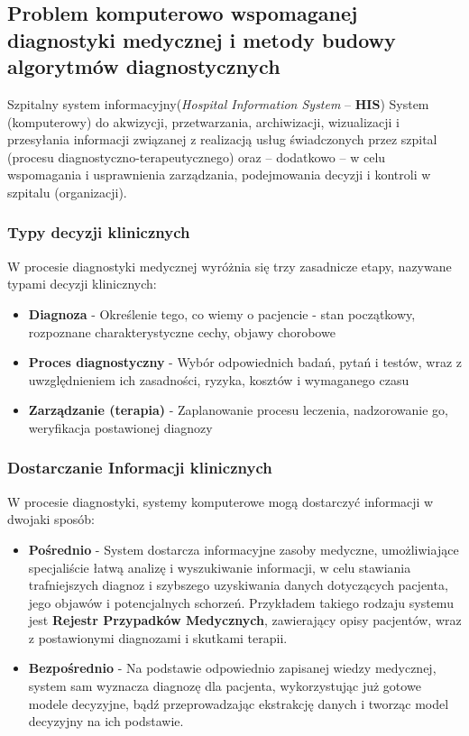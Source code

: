 \subsection{Problem komputerowo wspomaganej diagnostyki medycznej i metody budowy algorytmów diagnostycznych}

Szpitalny system informacyjny(\textit{Hospital Information System} – \textbf{HIS}) System (komputerowy) do akwizycji, przetwarzania, archiwizacji, wizualizacji i przesyłania informacji związanej z realizacją usług świadczonych przez szpital (procesu diagnostyczno-terapeutycznego) oraz – dodatkowo – w celu wspomagania i usprawnienia zarządzania, podejmowania decyzji i kontroli w szpitalu (organizacji).

\subsubsection{Typy decyzji klinicznych}

W procesie diagnostyki medycznej wyróżnia się trzy zasadnicze etapy, nazywane typami decyzji klinicznych:

\begin{itemize}
	\item \textbf{Diagnoza} - Określenie tego, co wiemy o pacjencie - stan początkowy, rozpoznane charakterystyczne cechy, objawy chorobowe
	\item \textbf{Proces diagnostyczny} - Wybór odpowiednich badań, pytań i testów, wraz z uwzględnieniem ich zasadności, ryzyka, kosztów i wymaganego czasu
	\item \textbf{Zarządzanie (terapia)} - Zaplanowanie procesu leczenia, nadzorowanie go, weryfikacja postawionej diagnozy \\
\end{itemize}

\subsubsection{Dostarczanie Informacji klinicznych}

W procesie diagnostyki, systemy komputerowe mogą dostarczyć informacji w dwojaki sposób:

\begin{itemize}
	\item \textbf{Pośrednio} - System dostarcza informacyjne zasoby medyczne, umożliwiające specjaliście łatwą analizę i wyszukiwanie informacji, w celu stawiania trafniejszych diagnoz i szybszego uzyskiwania danych dotyczących pacjenta, jego objawów i potencjalnych schorzeń. Przykładem takiego rodzaju systemu jest \textbf{Rejestr Przypadków Medycznych}, zawierający opisy pacjentów, wraz z postawionymi diagnozami i skutkami terapii.
	\item \textbf{Bezpośrednio} - Na podstawie odpowiednio zapisanej wiedzy medycznej, system sam wyznacza diagnozę dla pacjenta, wykorzystując już gotowe modele decyzyjne, bądź przeprowadzając ekstrakcję danych i tworząc model decyzyjny na ich podstawie. \\
\end{itemize}

